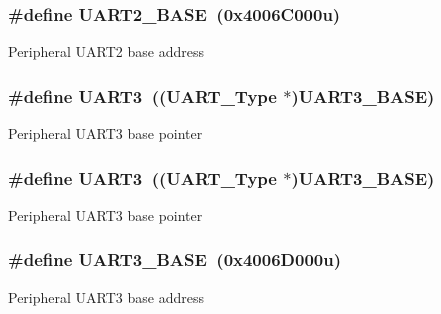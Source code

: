 \subsubsection[{\texorpdfstring{U\+A\+R\+T2\+\_\+\+B\+A\+SE}{UART2_BASE}}]{\setlength{\rightskip}{0pt plus 5cm}\#define U\+A\+R\+T2\+\_\+\+B\+A\+SE~(0x4006\+C000u)}\hypertarget{group__UART__Peripheral__Access__Layer_gac9998d643534960b684d45a60b998421}{}\label{group__UART__Peripheral__Access__Layer_gac9998d643534960b684d45a60b998421}
Peripheral U\+A\+R\+T2 base address 
\subsubsection[{\texorpdfstring{U\+A\+R\+T3}{UART3}}]{\setlength{\rightskip}{0pt plus 5cm}\#define U\+A\+R\+T3~(({\bf U\+A\+R\+T\+\_\+\+Type} $\ast$){\bf U\+A\+R\+T3\+\_\+\+B\+A\+SE})}\hypertarget{group__UART__Peripheral__Access__Layer_ga961726a611b38bcaf61f3d598b0a59ec}{}\label{group__UART__Peripheral__Access__Layer_ga961726a611b38bcaf61f3d598b0a59ec}
Peripheral U\+A\+R\+T3 base pointer 
\subsubsection[{\texorpdfstring{U\+A\+R\+T3}{UART3}}]{\setlength{\rightskip}{0pt plus 5cm}\#define U\+A\+R\+T3~(({\bf U\+A\+R\+T\+\_\+\+Type} $\ast$){\bf U\+A\+R\+T3\+\_\+\+B\+A\+SE})}\hypertarget{group__UART__Peripheral__Access__Layer_ga961726a611b38bcaf61f3d598b0a59ec}{}\label{group__UART__Peripheral__Access__Layer_ga961726a611b38bcaf61f3d598b0a59ec}
Peripheral U\+A\+R\+T3 base pointer 
\subsubsection[{\texorpdfstring{U\+A\+R\+T3\+\_\+\+B\+A\+SE}{UART3_BASE}}]{\setlength{\rightskip}{0pt plus 5cm}\#define U\+A\+R\+T3\+\_\+\+B\+A\+SE~(0x4006\+D000u)}\hypertarget{group__UART__Peripheral__Access__Layer_ga2eff3896840fdf741bd67d2d7fe99a34}{}\label{group__UART__Peripheral__Access__Layer_ga2eff3896840fdf741bd67d2d7fe99a34}
Peripheral U\+A\+R\+T3 base address 
